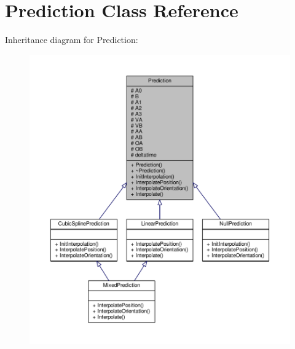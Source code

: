 \hypertarget{classPrediction}{}\section{Prediction Class Reference}
\label{classPrediction}


Inheritance diagram for Prediction\+:
\nopagebreak
\begin{figure}[H]
\begin{center}
\leavevmode
\includegraphics[width=350pt]{d0/d7b/classPrediction__inherit__graph}
\end{center}
\end{figure}


